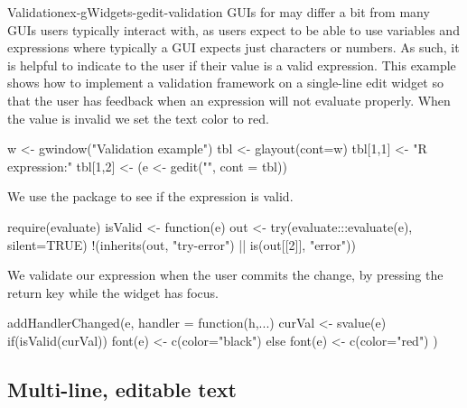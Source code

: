 \begin{example}{Validation}{ex-gWidgets-gedit-validation}
GUIs for \R\/ may differ a bit from many GUIs users typically
interact with, as \R\/ users expect to be able to use variables and
expressions where typically a GUI expects just characters or
numbers. As such, it is helpful to indicate to the user if their value
is a valid expression. This example shows how to implement a
validation framework on a single-line edit widget so that the user has
feedback when an expression will not evaluate properly.  When the
value is invalid we set the text color to red.


\begin{Schunk}
\begin{Sinput}
 w <- gwindow("Validation example")
 tbl <- glayout(cont=w)
 tbl[1,1] <- "R expression:"
 tbl[1,2] <- (e <- gedit("", cont = tbl))
\end{Sinput}
\end{Schunk}


We use the  package to see if the expression is valid.
\begin{Schunk}
\begin{Sinput}
 require(evaluate)
 isValid <- function(e) {
   out <- try(evaluate:::evaluate(e), silent=TRUE)
   !(inherits(out, "try-error") ||  is(out[[2]], "error"))
 }
\end{Sinput}
\end{Schunk}
%

We validate our expression when the user commits the change, by
pressing the return key while the widget has focus. 


\begin{Schunk}
\begin{Sinput}
 addHandlerChanged(e, handler = function(h,...) {
   curVal <- svalue(e)
   if(isValid(curVal)) {
     font(e) <- c(color="black")
   } else {
     font(e) <- c(color="red")
   }
 })
\end{Sinput}
\end{Schunk}

\end{example}

\subsection{Multi-line, editable text}
\label{sec:gWidgets-multi-line-editable}

